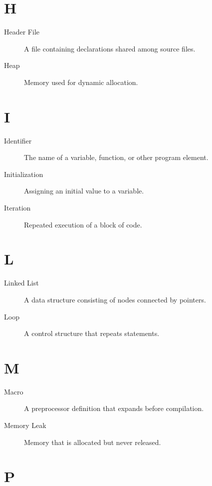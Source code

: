 \documentclass[12pt,openany]{book}
\begin{document}
\section*{H}

\begin{description}
    \item[Header File] A file containing declarations shared among source files.
    \item[Heap] Memory used for dynamic allocation.
\end{description}

\section*{I}

\begin{description}
    \item[Identifier] The name of a variable, function, or other program element.
    \item[Initialization] Assigning an initial value to a variable.
    \item[Iteration] Repeated execution of a block of code.
\end{description}

\section*{L}

\begin{description}
    \item[Linked List] A data structure consisting of nodes connected by pointers.
    \item[Loop] A control structure that repeats statements.
\end{description}

\section*{M}

\begin{description}
    \item[Macro] A preprocessor definition that expands before compilation.
    \item[Memory Leak] Memory that is allocated but never released.
\end{description}

\section*{P}
\end{document}
